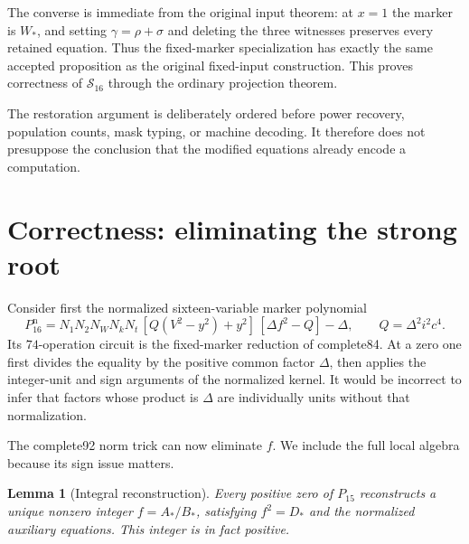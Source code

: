 \documentclass[11pt,a4paper]{article}
\newtheorem{lemma}[theorem]{Lemma}
\theoremstyle{remark}
\newcommand{\nf}{N_1}
\newcommand{\nm}{N_2}
\newcommand{\nw}{N_W}
\newcommand{\nk}{N_k}
\newcommand{\nt}{N_t}
\begin{document}
The converse is immediate from the original input theorem: at $x=1$
the marker is $W_*$, and setting $\gamma=\rho+\sigma$ and deleting
the three witnesses preserves every retained equation. Thus the
fixed-marker specialization has exactly the same accepted proposition
as the original fixed-input construction. This proves correctness of
$\mathcal S_{16}$ through the ordinary projection theorem.

The restoration argument is deliberately ordered before power recovery,
population counts, mask typing, or machine decoding. It therefore does
not presuppose the conclusion that the modified equations already
encode a computation.

\section{Correctness: eliminating the strong root}
\label{sec:elimproof}

Consider first the normalized sixteen-variable marker polynomial
\begin{equation}
 P_{16}^{\mathrm n}
 =\nf\nm\nw\nk\nt\,[Q(V^2-y^2)+y^2]\,[\Delta f^2-Q]-\Delta,
 \qquad Q=\Delta^2i^2c^4.
\label{eq:normalizedP}
\end{equation}
Its $74$-operation circuit is the fixed-marker reduction of complete84.
At a zero one first divides the equality by the positive common factor
$\Delta$, then applies the integer-unit and sign arguments of the
normalized kernel. It would be incorrect to infer that factors whose
product is $\Delta$ are individually units without that normalization.

The complete92 norm trick can now eliminate $f$. We include the full
local algebra because its sign issue matters.

\begin{lemma}[Integral reconstruction]
\label{lem:root}
Every positive zero of $P_{15}$ reconstructs a unique nonzero integer
$f=A_*/B_*$, satisfying $f^2=D_*$ and the normalized auxiliary
equations. This integer is in fact positive.
\end{lemma}
\end{document}
